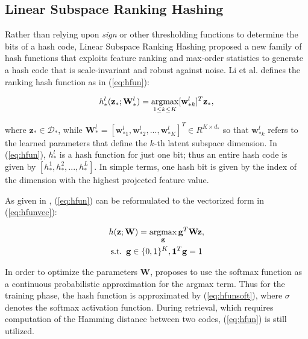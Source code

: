 \documentclass[letterpaper]{article}
\newcommand{\argmax}{\operatornamewithlimits{argmax}}
\begin{document}
\subsection{Linear Subspace Ranking Hashing}

Rather than relying upon \emph{sign} or other thresholding functions to determine the bits of a hash code, Linear Subspace Ranking Hashing \cite{kai} proposed a new family of hash functions that exploits feature ranking and max-order statistics to generate a hash code that is scale-invariant and robust against noise. Li et al. \cite{kai} defines the ranking hash function as in (\ref{eq:hfun}):

\begin{equation}
\label{eq:hfun}
h_*^l(\mathbf{z}_*; \mathbf{W}_*^l) = \argmax\limits_{1 \leq k \leq K} [\mathbf{w}_{*k}^l]^T \mathbf{z}_*,
\end{equation}

\noindent where $ \mathbf{z_*} \in \mathcal{D}_* $, while $ \mathbf{W}_*^l = [\mathbf{w}_{*1}^l, \mathbf{w}_{*2}^l, ..., \mathbf{w}_{*K}^l]^T \in R^{K \times d_*} $ so that $ \mathbf{w}_{*k}^l $ refers to the learned parameters that define the $k$-th latent subspace dimension. In (\ref{eq:hfun}), $ h_*^l $ is a hash function for just one bit; thus an entire hash code is given by $ [h_*^1, h_*^2, ..., h_*^L] $. In simple terms, one hash bit is given by the index of the dimension with the highest projected feature value.

As given in \cite{kai}, (\ref{eq:hfun}) can be reformulated to the vectorized form in (\ref{eq:hfunvec}):

\begin{equation}
\label{eq:hfunvec}
\begin{gathered}
h(\mathbf{z}; \mathbf{W}) = \argmax\limits_{\mathbf{g}} \mathbf{g}^T \mathbf{Wz}, \\
\text{s.t.} \enspace \mathbf{g} \in \{0,1\}^K, \mathbf{1}^T\mathbf{g} = 1
\end{gathered}
\end{equation}

In order to optimize the parameters $ \mathbf{W} $, \cite{kai} proposes to use the softmax function as a continuous probabilistic approximation for the argmax term. Thus for the training phase, the hash function is approximated by (\ref{eq:hfunsoft}), where $ \sigma $ denotes the softmax activation function. During retrieval, which requires computation of the Hamming distance between two codes, (\ref{eq:hfun}) is still utilized.
\end{document}
